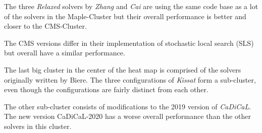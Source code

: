 \documentclass{elsarticle}
\begin{document}
The three \emph{Relaxed} solvers by \emph{Zhang} and \emph{Cai} are using the
same code base as a lot of the solvers in the Maple-Cluster but their overall
performance is better and closer to the CMS-Cluster.

The CMS versions differ in their implementation of stochastic local search (SLS)
but overall have a similar performance.

The last big cluster in the center of the heat map is comprised of the solvers
originally written by Biere. The three configurations of \emph{Kissat} form a
sub-cluster, even though the configurations are fairly distinct from each other.

The other sub-cluster consists of
modifications to the 2019 version of \emph{\mbox{CaDiCaL}}. The new version
CaDiCaL-2020 has a worse overall performance than
the other solvers in this cluster.
\end{document}
